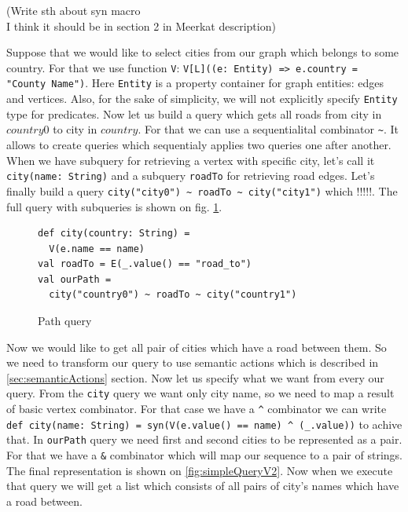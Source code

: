 (Write sth about syn macro \\ I think it should be in section 2 in Meerkat description)


Suppose that we would like to select cities from our graph which belongs to some country. 
For that we use function \lstinline{V}: \lstinline{V[L]((e: Entity) => e.country = "County Name")}.
Here \lstinline{Entity} is a property container for graph entities: edges and vertices. 
Also, for the sake of simplicity, we will not explicitly specify \lstinline{Entity} type for predicates. 
Now let us build a query which gets all roads from city in $country0$ to city in $country$. 
For that we can use a sequentialital combinator \lstinline{~}. 
It allows to create queries which sequentialy applies two queries one after another. 
When we have subquery for retrieving a vertex with specific city, let's call it \lstinline{city(name: String)} and a subquery \lstinline{roadTo} for retrieving road edges. 
Let's finally build a query \lstinline{city("city0") ~ roadTo ~ city("city1")} which !!!!!.
The full query with subqueries is shown on fig. \ref{fig:simpleQuery}.

\begin{figure}[h]
\begin{lstlisting}
def city(country: String) =
  V(e.name == name)
val roadTo = E(_.value() == "road_to")
val ourPath = 
  city("country0") ~ roadTo ~ city("country1")
\end{lstlisting}
\caption{Path query}
\label{fig:simpleQuery}
\end{figure}



Now we would like to get all pair of cities which have a road between them. 
So we need to transform our query to use semantic actions which is described in \ref{sec:semanticActions} section. 
Now let us specify what we want from every our query. 
From the \lstinline{city} query we want only city name, so we need to map a result of basic vertex combinator. 
For that case we have a \lstinline{^} combinator we can write \lstinline{def city(name: String) = syn(V(e.value() == name) ^ (_.value))} to achive that. 
In \lstinline{ourPath} query we need first and second cities to be represented as a pair. 
For that we have a \lstinline{&} combinator which will map our sequence to a pair of strings.
The final representation is shown on \ref{fig:simpleQueryV2}. 
Now when we execute that query we will get a list which consists of all pairs of city's names which have a road between.

